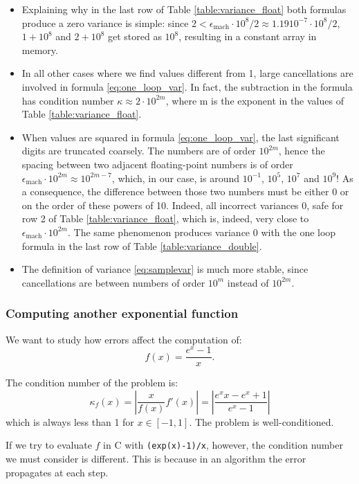 \documentclass[a4paper,11]{article}
\newcommand{\mdcode}[1]{\lstinline[backgroundcolor=\color{gray!10}, frame=single, frameround=tttt]|#1|}
\begin{document}
\begin{itemize}
	\item{
		Explaining why in the last row of Table \ref{table:variance_float} both 
		formulas produce a zero variance is simple: since 
		$2<\epsilon_{\text{mach}} \cdot 10^{8} /2
		\approx 1.19 10^{-7} \cdot  10^{8} /2$,
		$1+10^{8}$ and $2+10^{8}$ get stored as $10^{8}$, resulting in a 
		constant array in memory.
	}
	\item{
		In all other cases where we find values different from 1, large 
		cancellations are involved in formula \ref{eq:one_loop_var}. 
		In fact, the subtraction in the formula has condition number 
		$\kappa \approx 2\cdot 10^{2m}$, where m is the exponent in the values of 
		Table \ref{table:variance_float}.
	}
	\item{
		When values are squared in formula \ref{eq:one_loop_var},
		the last significant digits are truncated coarsely.
		The numbers are of order $10^{2m}$, hence the spacing between two 
		adjacent floating-point numbers is of order 
		$\epsilon_{\text{mach}}\cdot10^{2m}\approx 10^{2m-7}$, which, in our
		case, is around $10^{-1}$, $10^{5}$, $10^{7}$ and $10^{9}$!
		As a consequence, the difference between those two numbers must be 
		either 0 or on the order of these powers of 10. Indeed, all 
		incorrect variances 0, safe for row 2 of Table \ref{table:variance_float},
		which is, indeed, very close to $\epsilon_{\text{mach}}\cdot10^{2m}$.
		The same phenomenon produces variance 0 with the one loop formula 
		in the last row of Table \ref{table:variance_double}.
	}
	\item{
		The definition of variance \ref{eq:samplevar} is much more stable, since 
		cancellations are between numbers of order $10^{m}$ instead of 
		$10^{2m}$.
	}
\end{itemize}

\subsubsection{Computing another exponential function}

We want to study how errors affect the computation of:
\[
	f(x)=\frac{e^{x}-1}{x}.
\]

The condition number of the problem is:
\[
	\kappa_{f}(x)=\left|\frac{x}{f(x)}f'(x)\right|={}
		\left| \frac{e^{x}x-e^{x}+1}{e^{x}-1} \right|
\]
which is always less than 1 for $x \in [-1,1]$. The problem is 
well-conditioned.

If we try to evaluate $f$ in C with \mdcode{(exp(x)-1)/x}, however, 
the condition number we must consider
 is different. This is because in an algorithm 
the error propagates at each step.
\end{document}
